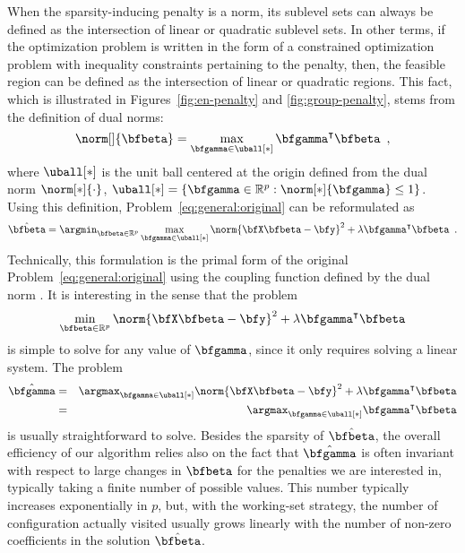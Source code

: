 When the sparsity-inducing penalty is a norm, its sublevel sets can always be
defined as the intersection of linear or quadratic sublevel sets.  In other
terms, if the optimization problem is written in the form of a constrained
optimization problem with inequality constraints pertaining to the penalty,
then, the feasible region can be defined as the intersection of linear or
quadratic regions. 
This fact, which is illustrated in Figures~\ref{fig:en-penalty} and
\ref{fig:group-penalty}, stems from the definition of dual norms:
%
\begin{equation*}%
  \norm[]{\bfbeta} = \max_{\bfgamma\in\uball[*]} \bfgamma^\intercal \bfbeta
  \enspace,
\end{equation*}
where $\uball[*]$ is the unit ball centered at the origin defined from the dual
norm $\norm[*]{\cdot}$,
$\uball[*]=\left\{\bfgamma\in\mathbb{R}^p:\norm[*]{\bfgamma}\leq 1\right\}$.
Using this definition, Problem~\eqref{eq:general:original} can be reformulated
as
%
\begin{equation}\label{eq:general:primal}
  \hat{\bfbeta} = \argmin_{\bfbeta\in\mathbb{R}^p} 
  \max_{\bfgamma\in\uball[*]}
    \norm{\bfX \bfbeta - \bfy}^2 + 
    \lambda \bfgamma^\intercal \bfbeta
  \enspace. 
\end{equation}
%
Technically, this formulation is the primal form of the original 
Problem~\eqref{eq:general:original} using the coupling function defined by the 
dual norm \citep[see e.g.][]{Gilbert16, Bonnans06}. 
It is interesting in the sense that the problem
%
\begin{equation*}
  \min_{\bfbeta\in\mathbb{R}^p} 
  \norm{\bfX \bfbeta - \bfy}^2 + 
  \lambda \bfgamma^\intercal \bfbeta
\end{equation*}
%
is simple to solve for any value of $\bfgamma$, since it only requires solving 
a linear system.
The problem
%
\begin{eqnarray*}
  \hat{\bfgamma} & = & \argmax_{\bfgamma\in\uball[*]}
    \norm{\bfX \bfbeta - \bfy}^2 + 
    \lambda \bfgamma^\intercal \bfbeta \\
     & = & \argmax_{\bfgamma\in\uball[*]}
    \bfgamma^\intercal \bfbeta
\end{eqnarray*}
%
is usually straightforward to solve.
Besides the sparsity of $\hat{\bfbeta}$, the overall efficiency of our algorithm
relies also on the fact that $\hat{\bfgamma}$ is often invariant with respect to
large changes in $\bfbeta$ for the penalties we are interested in, typically
taking a finite number of possible values.  
This number typically increases exponentially in $p$, but, with the working-set
strategy, the number of configuration actually visited usually grows linearly
with the number of non-zero coefficients in the solution $\hat{\bfbeta}$.

